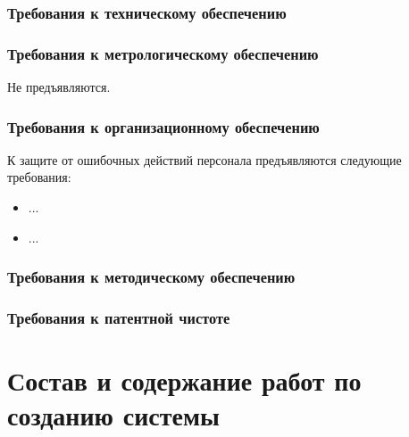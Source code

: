 \documentclass[a4paper, 12pt]{article}		%
\begin{document}
\subsubsection{Требования к техническому обеспечению}


\subsubsection{Требования к метрологическому обеспечению}

Не предъявляются.

\subsubsection{Требования к организационному обеспечению}

К защите от ошибочных действий персонала предъявляются следующие требования:
\begin{itemize}
\item ...
\item ...
\end{itemize}

\subsubsection{Требования к методическому обеспечению}


\subsubsection{Требования к патентной чистоте}


\newpage
\section{Состав и содержание работ по созданию системы}
\end{document}

